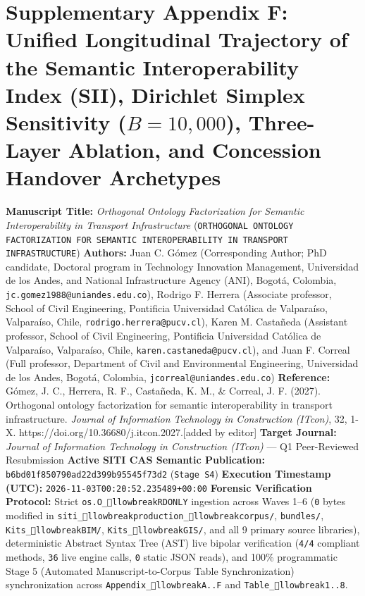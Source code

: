 \documentclass[10pt,a4paper]{article}
\begin{document}
\section*{Supplementary Appendix F: Unified Longitudinal Trajectory of the Semantic Interoperability Index (SII), Dirichlet Simplex Sensitivity ($B = 10,000$), Three-Layer Ablation, and Concession Handover Archetypes}

\textbf{Manuscript Title:} \textit{Orthogonal Ontology Factorization for Semantic Interoperability in Transport Infrastructure} (\texttt{ORTHOGONAL ONTOLOGY FACTORIZATION FOR SEMANTIC INTEROPERABILITY IN TRANSPORT INFRASTRUCTURE})
\textbf{Authors:} Juan C. Gómez (Corresponding Author; PhD candidate, Doctoral program in Technology Innovation Management, Universidad de los Andes, and National Infrastructure Agency (ANI), Bogotá, Colombia, \texttt{jc.gomez1988@uniandes.edu.co}), Rodrigo F. Herrera (Associate professor, School of Civil Engineering, Pontificia Universidad Católica de Valparaíso, Valparaíso, Chile, \texttt{rodrigo.herrera@pucv.cl}), Karen M. Castañeda (Assistant professor, School of Civil Engineering, Pontificia Universidad Católica de Valparaíso, Valparaíso, Chile, \texttt{karen.castaneda@pucv.cl}), and Juan F. Correal (Full professor, Department of Civil and Environmental Engineering, Universidad de los Andes, Bogotá, Colombia, \texttt{jcorreal@uniandes.edu.co})
\textbf{Reference:} Gómez, J. C., Herrera, R. F., Castañeda, K. M., \& Correal, J. F. (2027). Orthogonal ontology factorization for semantic interoperability in transport infrastructure. \textit{Journal of Information Technology in Construction (ITcon)}, 32, 1-X. https://doi.org/10.36680/j.itcon.2027.[added by editor]
\textbf{Target Journal:} \textit{Journal of Information Technology in Construction (ITcon)} --- Q1 Peer-Reviewed Resubmission
\textbf{Active SITI CAS Semantic Publication:} \texttt{b6bd01f850790ad22d399b95545f73d2} (\texttt{Stage S4})
\textbf{Execution Timestamp (UTC):} \texttt{2026-11-03T00:20:52.235489+00:00}
\textbf{Forensic Verification Protocol:} Strict \texttt{os.O\_llowbreak{}RDONLY} ingestion across Waves 1--6 (\texttt{0} bytes modified in \texttt{siti\_llowbreak{}production\_llowbreak{}corpus/}, \texttt{bundles/}, \texttt{Kits\_llowbreak{}BIM/}, \texttt{Kits\_llowbreak{}GIS/}, and all 9 primary source libraries), deterministic Abstract Syntax Tree (AST) live bipolar verification (\texttt{4/4} compliant methods, \texttt{36} live engine calls, \texttt{0} static JSON reads), and 100\% programmatic Stage 5 (Automated Manuscript-to-Corpus Table Synchronization) synchronization across \texttt{Appendix\_llowbreak{}A..F} and \texttt{Table\_llowbreak{}1..8}.
\end{document}
